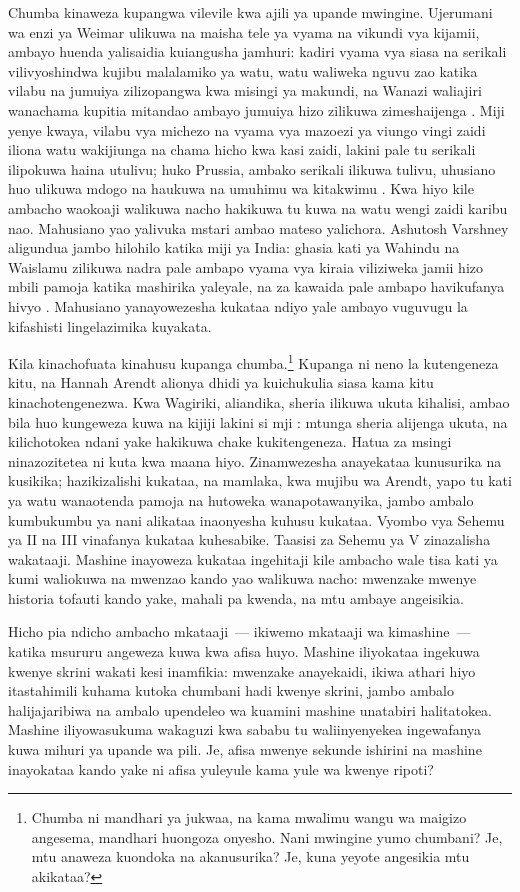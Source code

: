 Chumba kinaweza kupangwa vilevile kwa ajili ya upande mwingine. Ujerumani wa enzi ya Weimar ulikuwa na maisha tele ya vyama na vikundi vya kijamii, ambayo huenda yalisaidia kuiangusha jamhuri: kadiri vyama vya siasa na serikali vilivyoshindwa kujibu malalamiko ya watu, watu waliweka nguvu zao katika vilabu na jumuiya zilizopangwa kwa misingi ya makundi, na Wanazi waliajiri wanachama kupitia mitandao ambayo jumuiya hizo zilikuwa zimeshaijenga \autocite{berman1997weimar}. Miji yenye kwaya, vilabu vya michezo na vyama vya mazoezi ya viungo vingi zaidi iliona watu wakijiunga na chama hicho kwa kasi zaidi, lakini pale tu serikali ilipokuwa haina utulivu; huko Prussia, ambako serikali ilikuwa tulivu, uhusiano huo ulikuwa mdogo na haukuwa na umuhimu wa kitakwimu \autocite{satyanath2017bowling}. Kwa hiyo kile ambacho waokoaji walikuwa nacho hakikuwa tu kuwa na watu wengi zaidi karibu nao. Mahusiano yao yalivuka mstari ambao mateso yalichora. Ashutosh Varshney aligundua jambo hilohilo katika miji ya India: ghasia kati ya Wahindu na Waislamu zilikuwa nadra pale ambapo vyama vya kiraia viliziweka jamii hizo mbili pamoja katika mashirika yaleyale, na za kawaida pale ambapo havikufanya hivyo \autocite{varshney2002ethnic}. Mahusiano yanayowezesha kukataa ndiyo yale ambayo vuguvugu la kifashisti lingelazimika kuyakata.

Kila kinachofuata kinahusu kupanga chumba.\footnote{Chumba ni mandhari ya jukwaa, na kama mwalimu wangu wa maigizo angesema, mandhari huongoza onyesho. Nani mwingine yumo chumbani? Je, mtu anaweza kuondoka na akanusurika? Je, kuna yeyote angesikia mtu akikataa?} Kupanga ni neno la kutengeneza kitu, na Hannah Arendt alionya dhidi ya kuichukulia siasa kama kitu kinachotengenezwa. Kwa Wagiriki, aliandika, sheria ilikuwa ukuta kihalisi, ambao bila huo kungeweza kuwa na kijiji lakini si mji \autocite{arendt1958human}: mtunga sheria alijenga ukuta, na kilichotokea ndani yake hakikuwa chake kukitengeneza. Hatua za msingi ninazozitetea ni kuta kwa maana hiyo. Zinamwezesha anayekataa kunusurika na kusikika; hazikizalishi kukataa, na mamlaka, kwa mujibu wa Arendt, yapo tu kati ya watu wanaotenda pamoja na hutoweka wanapotawanyika, jambo ambalo kumbukumbu ya nani alikataa inaonyesha kuhusu kukataa. Vyombo vya Sehemu ya II na III vinafanya kukataa kuhesabike. Taasisi za Sehemu ya V zinazalisha wakataaji. Mashine inayoweza kukataa ingehitaji kile ambacho wale tisa kati ya kumi waliokuwa na mwenzao kando yao walikuwa nacho: mwenzake mwenye historia tofauti kando yake, mahali pa kwenda, na mtu ambaye angeisikia.

Hicho pia ndicho ambacho mkataaji~— ikiwemo mkataaji wa kimashine~— katika msururu angeweza kuwa kwa afisa huyo. Mashine iliyokataa ingekuwa kwenye skrini wakati kesi inamfikia: mwenzake anayekaidi, ikiwa athari hiyo itastahimili kuhama kutoka chumbani hadi kwenye skrini, jambo ambalo halijajaribiwa na ambalo upendeleo wa kuamini mashine unatabiri halitatokea. Mashine iliyowasukuma wakaguzi kwa sababu tu waliinyenyekea ingewafanya kuwa mihuri ya upande wa pili. Je, afisa mwenye sekunde ishirini na mashine inayokataa kando yake ni afisa yuleyule kama yule wa kwenye ripoti?
